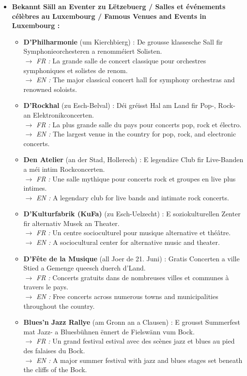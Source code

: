 \begin{itemize}
    \item \textbf{Bekannt Säll an Eventer zu Lëtzebuerg / Salles et événements célèbres au Luxembourg / Famous Venues and Events in Luxembourg :}
    \begin{itemize}
        \item \textbf{D'Philharmonie} (um Kierchbierg) : De grousse klassesche Sall fir Symphonieorchesteren a renomméiert Solisten. \\
        $\rightarrow$ \textit{FR :} La grande salle de concert classique pour orchestres symphoniques et solistes de renom. \\
        $\rightarrow$ \textit{EN :} The major classical concert hall for symphony orchestras and renowned soloists.
        \item \textbf{D'Rockhal} (zu Esch-Belval) : Déi gréisst Hal am Land fir Pop-, Rock- an Elektronikconcerten. \\
        $\rightarrow$ \textit{FR :} La plus grande salle du pays pour concerts pop, rock et électro. \\
        $\rightarrow$ \textit{EN :} The largest venue in the country for pop, rock, and electronic concerts.
        \item \textbf{Den Atelier} (an der Stad, Hollerech) : E legendäre Club fir Live-Banden a méi intim Rockconcerten. \\
        $\rightarrow$ \textit{FR :} Une salle mythique pour concerts rock et groupes en live plus intimes. \\
        $\rightarrow$ \textit{EN :} A legendary club for live bands and intimate rock concerts.
        \item \textbf{D'Kulturfabrik (KuFa)} (zu Esch-Uelzecht) : E soziokulturellen Zenter fir alternativ Musek an Theater. \\
        $\rightarrow$ \textit{FR :} Un centre socioculturel pour musique alternative et théâtre. \\
        $\rightarrow$ \textit{EN :} A sociocultural center for alternative music and theater.
        \item \textbf{D'Fête de la Musique} (all Joer de 21. Juni) : Gratis Concerten a ville Stied a Gemenge queesch duerch d'Land. \\
        $\rightarrow$ \textit{FR :} Concerts gratuits dans de nombreuses villes et communes à travers le pays. \\
        $\rightarrow$ \textit{EN :} Free concerts across numerous towns and municipalities throughout the country.
        \item \textbf{Blues'n Jazz Rallye} (am Gronn an a Clausen) : E grousst Summerfest mat Jazz- a Bluesbühnen ënnert de Fielswänn vum Bock. \\
        $\rightarrow$ \textit{FR :} Un grand festival estival avec des scènes jazz et blues au pied des falaises du Bock. \\
        $\rightarrow$ \textit{EN :} A major summer festival with jazz and blues stages set beneath the cliffs of the Bock.
    \end{itemize}
\end{itemize}

